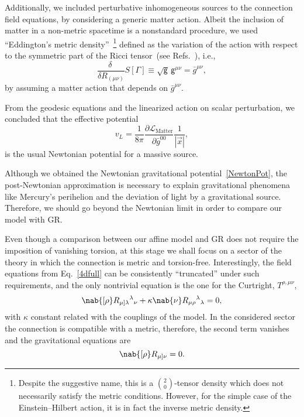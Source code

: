 \documentclass[aps,prl,twocolumn,superscriptaddress,showpacs,showkeys]{revtex4-1}
\begin{document}
Additionally, we included perturbative inhomogeneous sources to the connection field equations, by considering a generic matter action. Albeit the inclusion of matter in a non-metric spacetime is a nonstandard procedure, we used ``Eddington's metric density''~\footnote{Despite the suggestive name, this is a $\binom{2}{0}$-tensor density which does not necessarily satisfy the metric conditions. However, for the simple case of the Einstein--Hilbert action, it is in fact the inverse metric density.} defined as the variation of the action with respect to the symmetric part of the Ricci tensor~(see Refs.~\cite{Eddington1923math,schrodinger1950space,Poplawski:2012bw}), i.e.,%
\begin{equation}
  \label{metric}
  \frac{\delta\ }{\delta R_{(\mu\nu)}} S[\Gamma] \equiv \sqrt{\mathsf{g}} \, \mathsf{g}^{\mu\nu} = \bar{g}^{\mu\nu} ,
\end{equation}
by assuming a matter action that depends on $\bar{g}^{\mu\nu}$.

From the geodesic equations and the linearized action on scalar perturbation, we concluded that the effective potential
\begin{equation}
  \label{NewtonPot}
  v_L = \frac{1}{8\pi} \frac{ \partial\mathcal{L}_{\text{Matter}} }{ \partial \bar{g}^{00} } \frac{1}{|\vec{x}|},
\end{equation}
is the usual Newtonian potential for a massive source.

Although we obtained the Newtonian gravitational potential~\eqref{NewtonPot}, the post-Newtonian approximation is necessary to explain gravitational phenomena like Mercury's perihelion and the deviation of light by a gravitational source. Therefore, we should go beyond the Newtonian limit in order to compare our model with GR.

Even though a comparison between our affine model and GR does not require the imposition of vanishing torsion, at this stage we shall focus on a sector of the theory in which the connection is metric and torsion-free. Interestingly, the field equations from Eq.~\eqref{4dfull} can be consistently ``truncated'' under such requirements, and the only nontrivial equation is the one for the Curtright, $T^{\rho,\mu\nu}$,
\begin{equation*}
  \nab{[\rho} R_{\mu]\lambda}{}^{\lambda}{}_{\nu} + \kappa \nab{\nu} R_{\mu\rho}{}^\lambda{}_\lambda = 0,
\end{equation*}
with $\kappa$ constant related with the couplings of the model. In the considered sector the connection is compatible with a metric, therefore, the second term vanishes and the gravitational equations are
\begin{equation}
  \nab{[\rho} R_{\mu]\nu} = 0.
  \label{SimpleEOM}
\end{equation}
\end{document}
